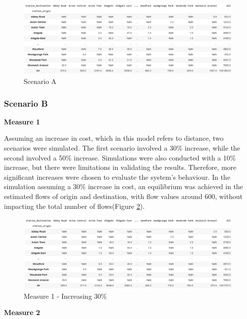 \documentclass[10pt]{report}
\numberwithin{figure}{section}
\numberwithin{table}{section}
\begin{document}
    \begin{figure}[htp]
        \centering
        \includegraphics[width=16cm]{Image/Part2_OD4_scenario A.png}
        \caption{Scenario A}
        \label{fig:Part2_OD4_scenario A}
    \end{figure}
  

\subsubsection{Scenario B}

\textbf{Measure 1}

Assuming an increase in cost, which in this model refers to distance, two scenarios were simulated. The first scenario involved a 30\% increase, while the second involved a 50\% increase. Simulations were also conducted with a 10\% increase, but there were limitations in validating the results. Therefore, more significant increases were chosen to evaluate the system's behaviour. In the simulation assuming a 30\% increase in cost, an equilibrium was achieved in the estimated flows of origin and destination, with flow values around 600, without impacting the total number of flows(Figure \ref{fig:Part2_OD6_scenario B}).

    \begin{figure}[htp]
        \centering
        \includegraphics[width=16cm]{Image/Part2_OD6_scenario B.png}
        \caption{Measure 1 - Increasing 30\%}
        \label{fig:Part2_OD6_scenario B}
    \end{figure}

\newpage  

\textbf{Measure 2}    
\end{document}
